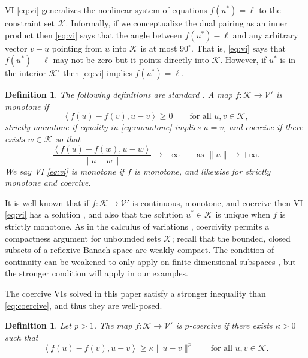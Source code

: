 \documentclass[letterpaper,final,12pt,reqno]{amsart}
\theoremstyle{cstyle}
\theoremstyle{cstyle*}
\theoremstyle{dstyle}
\newtheorem{definition}[theorem]{Definition}
\numberwithin{equation}{section}
\numberwithin{figure}{section}
\numberwithin{table}{section}
\numberwithin{theorem}{section}
\newcommand{\cK}{\mathcal{K}}
\newcommand{\cV}{\mathcal{V}}
\newcommand{\ip}[2]{\left<#1,#2\right>}
\begin{document}
VI \eqref{eq:vi} generalizes the nonlinear system of equations $f(u^*)=\ell$ to the constraint set $\cK$.  Informally, if we conceptualize the dual pairing as an inner product then \eqref{eq:vi} says that the angle between $f(u^*)-\ell$ and any arbitrary vector $v-u$ pointing from $u$ into $\cK$ is at most $90^\circ$.  That is, \eqref{eq:vi} says that $f(u^*)-\ell$ may not be zero but it points directly into $\cK$.  However, if $u^*$ is in the interior $\cK^\circ$ then \eqref{eq:vi} implies $f(u^*)=\ell$.

\begin{definition} The following definitions are standard \cite{KinderlehrerStampacchia1980}.  A map $f:\cK \to \cV'$ is \emph{monotone} if
\begin{equation}
\ip{f(u)-f(v)}{u-v} \ge 0 \qquad \text{for all } u,v \in \cK, \label{eq:monotone}
\end{equation}
\emph{strictly monotone} if equality in \eqref{eq:monotone} implies $u=v$, and \emph{coercive} if there exists $w \in \cK$ so that
\begin{equation}
\frac{\ip{f(u)-f(w)}{u-w}}{\|u-w\|} \to +\infty \qquad \text{as } \|u\|\to +\infty. \label{eq:coercive}
\end{equation}
We say VI \eqref{eq:vi} is \emph{monotone} if $f$ is monotone, and likewise for strictly monotone and coercive. \end{definition}

It is well-known that if $f:\cK \to \cV'$ is continuous, monotone, and coercive then VI \eqref{eq:vi} has a solution \cite[Corollary III.1.8]{KinderlehrerStampacchia1980}, and also that the solution $u^* \in \cK$ is unique when $f$ is strictly monotone.  As in the calculus of variations \cite{Evans2010}, coercivity permits a compactness argument for unbounded sets $\cK$; recall that the bounded, closed subsets of a reflexive Banach space are weakly compact.  The condition of continuity can be weakened to only apply on finite-dimensional subspaces \cite{KinderlehrerStampacchia1980}, but the stronger condition will apply in our examples.

The coercive VIs solved in this paper satisfy a stronger inequality than \eqref{eq:coercive}, and thus they are well-posed.

\begin{definition}  Let $p>1$.  The map $f:\cK \to \cV'$ is \emph{$p$-coercive} if there exists $\kappa>0$ such that
\begin{equation}
\ip{f(u)-f(v)}{u-v} \ge \kappa \|u-v\|^p \qquad \text{for all } u,v \in \cK. \label{eq:pcoercive}
\end{equation}
\end{definition}
\end{document}
